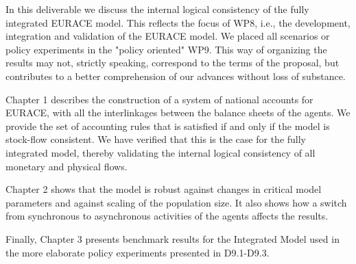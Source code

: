 In this deliverable we discuss the internal logical consistency of the
fully integrated EURACE model. This reflects the focus of WP8, i.e., the development, integration and
validation of the EURACE model. We placed all scenarios or policy experiments in the "policy oriented" WP9.
This way of organizing the results may not, strictly speaking, correspond to the terms of the proposal, but contributes to a better
comprehension of our advances without loss of substance.

\bigskip
Chapter 1 describes the construction of a system of national accounts
for EURACE, with all the interlinkages between the balance sheets of
the agents. We provide the set of accounting rules that is
satisfied if and only if the model is stock-flow consistent. We have verified
that this is the case for the fully integrated model, thereby
validating the internal logical consistency of all monetary and
physical flows.

\bigskip
Chapter 2 shows that the model is robust against
changes in critical model parameters and against scaling of the population
size. It also shows how a switch from synchronous to asynchronous
activities of the agents affects the results.

\bigskip
Finally, Chapter 3 presents benchmark results for the Integrated
Model used in the more elaborate policy
experiments presented in D9.1-D9.3. 